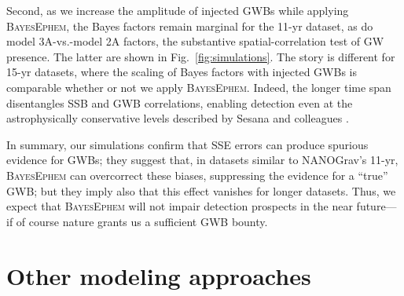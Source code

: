 \documentclass[iop,apj,twocolappendix]{emulateapj}
\begin{document}
Second, as we increase the amplitude of injected GWBs while applying \textsc{BayesEphem}, the Bayes factors remain marginal for the 11-yr dataset, as do model 3A-vs.-model 2A factors, the substantive spatial-correlation test of GW presence. The latter are shown in Fig.\ \ref{fig:simulations}.
The story is different for 15-yr datasets, where the scaling of Bayes factors with injected GWBs is comparable whether or not we apply \textsc{BayesEphem}. Indeed, the longer time span disentangles SSB and GWB correlations, enabling detection even at the astrophysically conservative levels described by Sesana and colleagues \citep{2016MNRAS.463L...6S}.

In summary, our simulations confirm that SSE errors can produce spurious evidence for GWBs; they suggest that, in datasets similar to NANOGrav's 11-yr, \textsc{BayesEphem} can overcorrect these biases, suppressing the evidence for a ``true'' GWB; but they imply also that this effect vanishes for longer datasets. Thus, we expect that \textsc{BayesEphem} will not impair detection prospects in the near future---if of course nature grants us a sufficient GWB bounty.

\section{Other modeling approaches}
\label{sec:othermodels}
\end{document}
